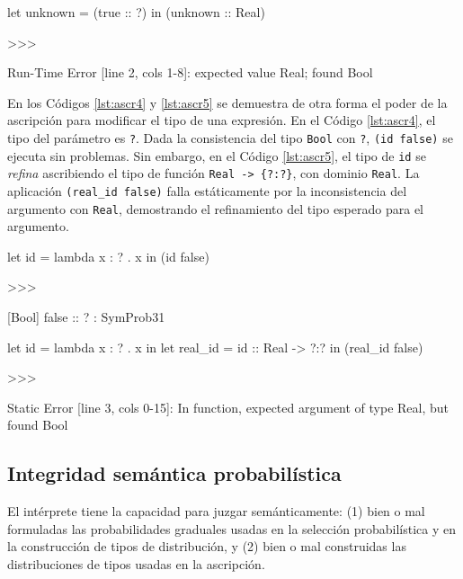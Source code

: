 \begin{gplcblock}[caption={Ascripción rechazada dinámicamente},label={lst:ascr3}]
let unknown = (true :: ?) in
(unknown :: Real)

>>>

Run-Time Error [line 2, cols 1-8]: expected value Real; found Bool
\end{gplcblock}


En los Códigos \ref{lst:ascr4} y \ref{lst:ascr5} se demuestra
de otra forma el poder de la ascripción para
modificar el tipo de una expresión. En el Código
\ref{lst:ascr4}, el tipo del parámetro es \lstinline|?|. Dada la
consistencia del tipo \lstinline|Bool| con \lstinline|?|, \lstinline|(id false)|
se ejecuta sin problemas. Sin embargo, en el
Código \ref{lst:ascr5},
el tipo de \lstinline|id| se \emph{refina} ascribiendo el tipo
de función \lstinline|Real -> {?:?}|, con dominio \lstinline|Real|.
La aplicación \lstinline|(real_id false)| falla estáticamente
por la inconsistencia del argumento con \lstinline|Real|,
demostrando el refinamiento del tipo esperado
para el argumento.


\begin{gplcblock}[caption={Lambda con parámetro sin tipo},label={lst:ascr4}]
let id = lambda x : ? . x in
(id false) 

>>>

{
	 [Bool] false :: ? : SymProb31 
}  
\end{gplcblock}





\begin{gplcblock}[caption={Lambda con parámetro de tipo refinado a \texttt{Real}},label={lst:ascr5}]
let id = lambda x : ? . x in
let real_id = id :: Real -> {?:?} in
(real_id false)

>>>

Static Error [line 3, cols 0-15]: In function, expected argument of type Real, but found Bool
\end{gplcblock}




\subsection{Integridad semántica probabilística}

El intérprete tiene la capacidad para juzgar semánticamente:
{(1)} bien o mal formuladas las probabilidades graduales usadas
en la selección probabilística y en la construcción de tipos de
distribución, y {(2)} bien o mal construidas las distribuciones
de tipos usadas en la ascripción.

